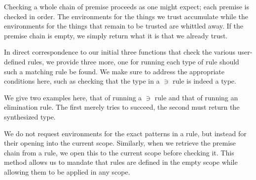 Checking a whole chain of premise proceeds as one might expect; each premise is
checked in order. The environments for the things we trust accumulate while the
environments for the things that remain to be trusted are whittled away. If the
premise chain is empty, we simply return what it is that we already trust.

In direct correspondence to our initial three functions that check the
various user-defined rules, we provide three more, one for running each
type of rule should such a matching rule be found. We make sure to address
the appropriate conditions here, such as checking that the type in a $∋$
rule is indeed a type.

We give two examples here, that of running a $∋$ rule and that of running
an elimination rule. The first merely tries to succeed, the second must
return the synthesized type.

We do not request environments for the exact patterns in a rule, but instead
for their opening into the current scope. Similarly, when we retrieve the
premise chain from a rule, we open this to the current scope before
checking it. This method allows us to mandate that rules are defined in the
empty scope while allowing them to be applied in any scope.

